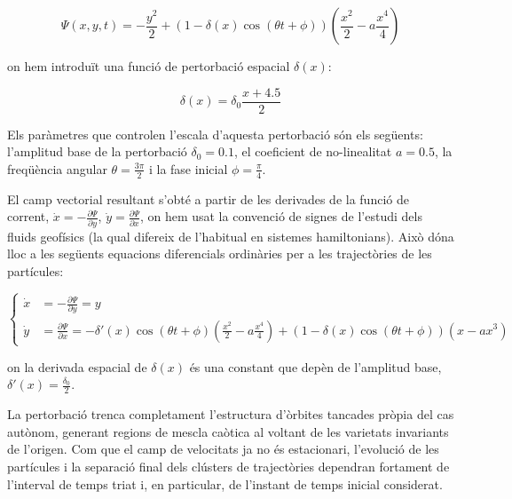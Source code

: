 \documentclass[12,twoside]{TFG-GM}
\theoremstyle{definition}
\theoremstyle{remark}
\begin{document}
\begin{equation}
    \label{eq:stream_function_no_autonom}
    \Psi(x, y, t) = -\frac{y^2}{2} + \left(1 - \delta(x) \cos(\theta t + \phi)\right) \left(\frac{x^2}{2} - a\frac{x^4}{4}\right)
\end{equation}

on hem introduït una funció de pertorbació espacial $\delta(x)$:

\begin{equation}
    \delta(x) = \delta_0 \frac{x + 4.5}{2}
\end{equation}

Els paràmetres que controlen l'escala d'aquesta pertorbació són els següents: l'amplitud base de la pertorbació $\delta_0 = 0.1$, el coeficient de no-linealitat $a = 0.5$, la freqüència angular $\theta = \frac{3\pi}{2}$ i la fase inicial $\phi = \frac{\pi}{4}$.

El camp vectorial resultant s'obté a partir de les derivades de la funció de corrent, $\dot{x} = -\frac{\partial \Psi}{\partial y}$, $\dot{y} = \frac{\partial \Psi}{\partial x}$, on hem usat la convenció de signes de l'estudi dels fluids geofísics (la qual difereix de l'habitual en sistemes hamiltonians). Això dóna lloc a les següents equacions diferencials ordinàries per a les trajectòries de les partícules:

\begin{equation}
    \label{eq:pertorbacio_no_autonom}
    \left\{
    \begin{aligned}
        \dot{x} &= -\frac{\partial \Psi}{\partial y} = y \\
        \dot{y} &= \frac{\partial \Psi}{\partial x} = - \delta'(x) \cos(\theta t + \phi) \left( \frac{x^2}{2} - a \frac{x^4}{4} \right) + (1 - \delta(x) \cos(\theta t + \phi)) (x - a x^3)
    \end{aligned}
    \right.
\end{equation}

on la derivada espacial de $\delta(x)$ és una constant que depèn de l'amplitud base, $\delta'(x) = \frac{\delta_0}{2}$.

La pertorbació trenca completament l'estructura d'òrbites tancades pròpia del cas autònom, generant regions de mescla caòtica al voltant de les varietats invariants de l'origen. Com que el camp de velocitats ja no és estacionari, l'evolució de les partícules i la separació final dels clústers de trajectòries dependran fortament de l'interval de temps triat i, en particular, de l'instant de temps inicial considerat.
\end{document}
